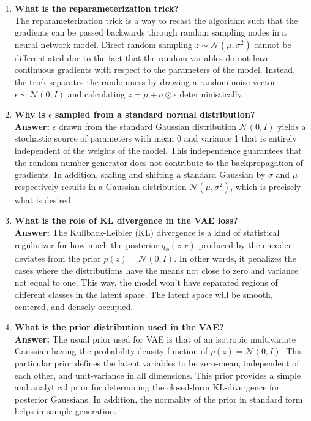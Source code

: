 \documentclass[10pt]{article}
\begin{document}
\begin{enumerate}
\item \textbf{What is the reparameterization trick?}\\[1.5mm]
The reparameterization trick is a way to recast the algorithm such that the gradients can be passed backwards through random sampling nodes in a neural network model. Direct random sampling $z \sim \mathcal{N}(\mu, \sigma^2)$ cannot be differentiated due to the fact that the random variables do not have continuous gradients with respect to the parameters of the model. Instead, the trick separates the randomness by drawing a random noise vector $\epsilon \sim \mathcal{N}(0, I)$ and calculating $z = \mu + \sigma \odot \epsilon$ deterministically.

\vspace{5mm}

\item \textbf{Why is $\epsilon$ sampled from a standard normal distribution?}\\[1.5mm]
\textbf{Answer:} $\epsilon$ drawn from the standard Gaussian distribution $\mathcal{N}(0, I)$ yields a stochastic source of parameters with mean 0 and variance 1 that is entirely independent of the weights of the model. This independence guarantees that the random number generator does not contribute to the backpropagation of gradients. In addition, scaling and shifting a standard Gaussian by $\sigma$ and $\mu$ respectively results in a Gaussian distribution $\mathcal{N}(\mu, \sigma^2)$, which is precisely what is desired.

\vspace{5mm}

\item \textbf{What is the role of KL divergence in the VAE loss?}\\[1.5mm]
\textbf{Answer:} The Kullback-Leibler (KL) divergence is a kind of statistical regularizer for how much the posterior $q_\phi(z|x)$ produced by the encoder deviates from the prior $p(z)=\mathcal{N}(0, I)$. In other words, it penalizes the cases where the distributions have the means not close to zero and variance not equal to one. This way, the model won't have separated regions of different classes in the latent space. The latent space will be smooth, centered, and densely occupied.

\vspace{5mm}

\item \textbf{What is the prior distribution used in the VAE?}\\[1.5mm]
\textbf{Answer:} The usual prior used for VAE is that of an isotropic multivariate Gaussian having the probability density function of $p(z) = \mathcal{N}(0, I)$. This particular prior defines the latent variables to be zero-mean, independent of each other, and unit-variance in all dimensions. This prior provides a simple and analytical prior for determining the closed-form KL-divergence for posterior Gaussians. In addition, the normality of the prior in standard form helps in sample generation.


\end{enumerate}
\end{document}
